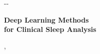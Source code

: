 \begin{titlepage}
\begin{adjustwidth*}{}{-\marginparwidth-\marginparsep}
\begin{center}

    \vfill
    
    \begingroup
        \Huge
        {\selectfont \sffamily \textbf{Deep Learning Methods\\for Clinical Sleep Analysis}}
    \endgroup
    
    \bigskip 
    
    \bigskip
    
    \begingroup
        \LARGE
        {\selectfont \sffamily \myName}
    \endgroup
    
    
    \bigskip
    
    \begingroup
        \Large
        {\selectfont \sffamily \myDocument, \myTime}
    \endgroup
    
    \vfill
    
    \vfill
    
\end{center}
\end{adjustwidth*}
\end{titlepage}